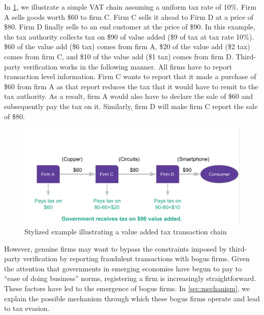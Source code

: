 In \cref{fig:bogus-mechanism}, we illustrate a simple VAT chain assuming a uniform tax rate of 10\%. Firm A sells goods worth \$60 to firm C. Firm C sells it ahead to Firm D at a price of \$80. Firm D finally sells to an end customer at the price of \$90. In this example, the tax authority collects tax on \$90 of value added (\$9 of tax at tax rate 10\%). \$60 of the value add (\$6 tax) comes from firm A, \$20 of the value add (\$2 tax) comes from firm C, and \$10 of the value add (\$1 tax) comes from firm D. Third-party verification works in the following manner. All firms have to report transaction level information. Firm C wants to report that it made a purchase of \$60 from firm A as that report reduces the tax that it would have to remit to the tax authority. As a result, firm A would also have to declare the sale of \$60 and subsequently pay the tax on it. Similarly, firm D will make firm C report the sale of \$80.

\begin{figure}
  \includegraphics[width=1\textwidth]{graphs/VATExample.png}
  \caption{Stylized example illustrating a value added tax transaction chain}
  \label{fig:bogus-mechanism}
\end{figure}
However, genuine firms may want to bypass the constraints imposed by third-party verification by reporting fraudulent transactions with bogus firms. Given the attention that governments in emerging economies have begun to pay to ``ease of doing business'' norms, registering a firm is increasingly straightforward. These factors have led to the emergence of bogus firms. In \cref{sec:mechanism}, we explain the possible mechanism through which these bogus firms operate and lead to tax evasion.

